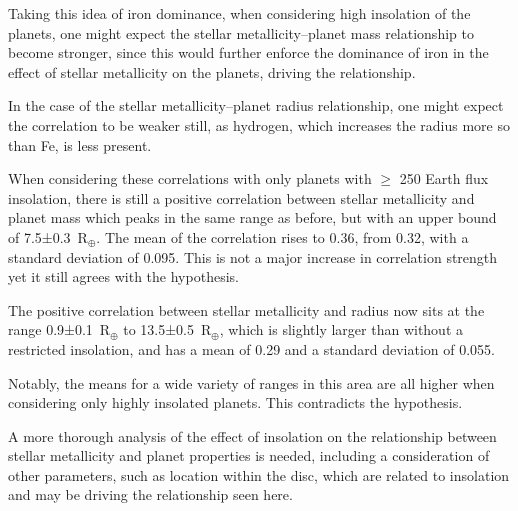 \documentclass[a4paper,twocolumn,12pt]{article}
\begin{document}
Taking this idea of iron dominance, when considering high insolation of the planets, one might expect the stellar metallicity--planet mass relationship to become stronger, since this would further enforce the dominance of iron in the effect of stellar metallicity on the planets, driving the relationship.

In the case of the stellar metallicity--planet radius relationship, one might expect the correlation to be weaker still, as hydrogen, which increases the radius more so than Fe, is less present.

When considering these correlations with only planets with $\geq$ 250 Earth flux insolation, there is still a positive correlation between stellar metallicity and planet mass which peaks in the same range as before, but with an upper bound of 7.5±0.3~R$_\oplus$. The mean of the correlation rises to 0.36, from 0.32, with a standard deviation of 0.095. This is not a major increase in correlation strength yet it still agrees with the hypothesis.

The positive correlation between stellar metallicity and radius now sits at the range 0.9±0.1~R$_\oplus$ to 13.5±0.5~R$_\oplus$, which is slightly larger than without a restricted insolation, and has a mean of 0.29 and a standard deviation of 0.055.

Notably, the means for a wide variety of ranges in this area are all higher when considering only highly insolated planets. This contradicts the hypothesis.

A more thorough analysis of the effect of insolation on the relationship between stellar metallicity and planet properties is needed, including a consideration of other parameters, such as location within the disc, which are related to insolation and may be driving the relationship seen here.




\end{document}
